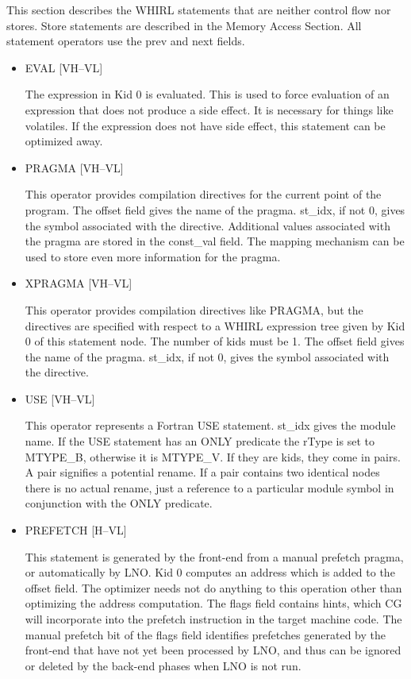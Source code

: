 This section describes the WHIRL statements that are neither
control flow nor stores. Store statements are described in the Memory
Access Section. All statement operators use the prev and next
fields. 
\begin{itemize}

\item
{}%
EVAL \hfill [VH--VL]

The expression in Kid 0 is evaluated. This is used to force evaluation
of an expression that does not produce a side effect. It is necessary
for things like volatiles. If the expression does not have side effect,
this statement can be optimized away.

\item
{}%
PRAGMA \hfill [VH--VL]

This operator provides compilation directives for the current point
of the program. The offset field gives the name of the pragma.
st\_idx, if not 0,
gives the symbol associated with the directive. Additional values
associated with the pragma are stored in the const\_val field. The
mapping mechanism can be used to store even more information for
the pragma. 

\item
{}%
XPRAGMA \hfill [VH--VL]

This operator provides compilation directives like
%
PRAGMA, but the
directives are specified with respect to a WHIRL expression tree
given by
Kid 0 of this statement node. The number of kids must be 1. The
offset field gives the name of the pragma. st\_idx, if not 0, gives
the symbol associated with the directive. 

\item
{}%
USE \hfill [VH--VL]

This operator represents a Fortran USE statement. 
 st\_idx gives
the module name.
If the USE statement has an ONLY predicate the 
rType is set to MTYPE\_B, otherwise it is MTYPE\_V. 
If they are kids, they come in pairs. A pair signifies 
a potential rename. If a pair contains two identical nodes there 
is no actual rename, just a reference to a particular module symbol in conjunction 
with the ONLY predicate.

\item
{}%
PREFETCH \hfill \hfill [H--VL]

This statement is generated by the front-end from a manual
prefetch pragma, or automatically by LNO. Kid 0 computes an address
which is added to the offset field. The optimizer needs not do anything to
this operation other than optimizing the address computation. The
flags field contains hints, which CG will incorporate into the
prefetch instruction in the target machine code. The manual prefetch
bit of the flags field identifies prefetches generated by the
front-end that have not yet been processed by LNO, and thus can
be ignored or deleted by the back-end phases when LNO is not run.



\end{itemize}
